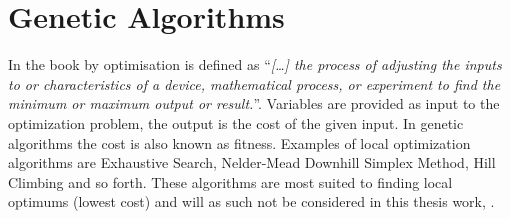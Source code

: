 


\section{Genetic Algorithms}
\label{GeneticAlgorithm}
In the book  by \cite{Haupt2004} optimisation is defined as ``\textit{[\dots] the process of adjusting the inputs to or characteristics of a device, mathematical process, or experiment to find the minimum or maximum output or result.}''. Variables are provided as input to the optimization problem, the output is the cost of the given input. In genetic algorithms the cost is also known as fitness. Examples of local optimization algorithms are Exhaustive Search, Nelder-Mead Downhill Simplex Method, Hill Climbing and so forth. These algorithms are most suited to finding local optimums (lowest cost) and will as such not be considered in this thesis work, \parencite{Haupt2004}.

